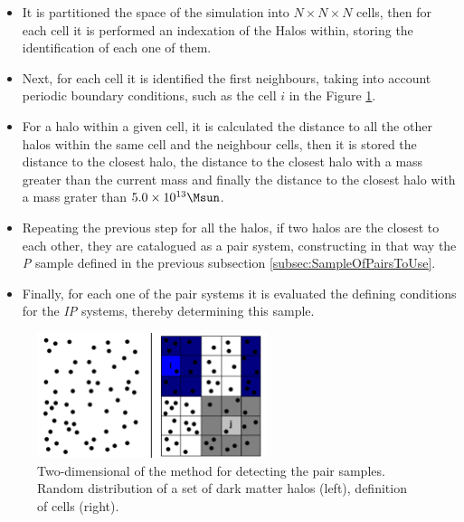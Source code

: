 \begin{itemize}
\item It is partitioned the space of the simulation into $N\times N \times
N$ cells, then for each cell it is performed an indexation of the Halos 
within, storing the identification of each one of them.

\item Next, for each cell it is identified the first neighbours, taking 
into account periodic boundary conditions, such as the cell $i$ in the 
Figure \ref{fig:Pair_Finder}.

\item For a halo within a given cell, it is calculated the distance to 
all the other halos within the same cell and the neighbour cells, then
it is stored the distance to the closest halo, the distance to the closest
halo with a mass greater than the current mass and finally the distance to 
the closest halo with a mass grater than $5.0 \times 10^{13}\Msun$.

\item Repeating the previous step for all the halos, if two halos are the
closest to each other, they are catalogued as a pair system, constructing
in that way the \textit{P} sample defined in the previous subsection
\ref{subsec:SampleOfPairsToUse}.

\item Finally, for each one of the pair systems it is evaluated the 
defining conditions for the \textit{IP} systems, thereby determining 
this sample.
\end{itemize}


\begin{figure}[htbp]
	\centering
	\includegraphics[width=0.6\textwidth]
	{./figures/3_nbody_simulations/PairFinder.png}

	\caption{\small{Two-dimensional of the method for detecting the pair 
	samples. Random distribution of a set of dark matter halos (left), 
	definition of cells (right).}}
	\label{fig:Pair_Finder}
\end{figure}


